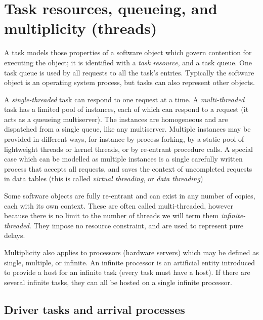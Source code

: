 \documentclass[11pt]{article}
\begin{document}
\section{Task resources, queueing, and multiplicity (threads)}
\label{sec:tasks}

A task models those properties of a software object which govern contention for executing the
object; it is identified with a \emph{task resource}, and a task queue. One task queue is used by all requests
to all the task's entries. Typically the software object is an operating system process, but tasks can
also represent other objects.

A \emph{single-threaded} task can respond to one request at a time. A \emph{multi-threaded} task has a
limited pool of instances, each of which can respond to a request (it acts as a queueing multiserver).
The instances are homogeneous and are dispatched from a single queue, like any multiserver.
Multiple instances may be provided in different ways, for instance by process forking, by a static
pool of lightweight threads or kernel threads, or by re-entrant procedure calls. A special case which
can be modelled as multiple instances is a single carefully written process that accepts all requests,
and saves the context of uncompleted requests in data tables (this is called \emph{virtual threading}, or \emph{data
threading})

Some software objects are fully re-entrant and can exist in any number of copies, each with its
own context. These are often called multi-threaded, however because there is no limit to the number
of threads we will term them \emph{infinite-threaded}. They impose no resource constraint, and are used to
represent pure delays.

Multiplicity also applies to processors (hardware servers) which may be defined as single,
multiple, or infinite. An infinite processor is an artificial entity introduced to provide a host for an
infinite task (every task must have a host). If there are several infinite tasks, they can all be hosted
on a single infinite processor.

\subsection{Driver tasks and arrival processes}
\label{sec:driver-tasks}
\end{document}
